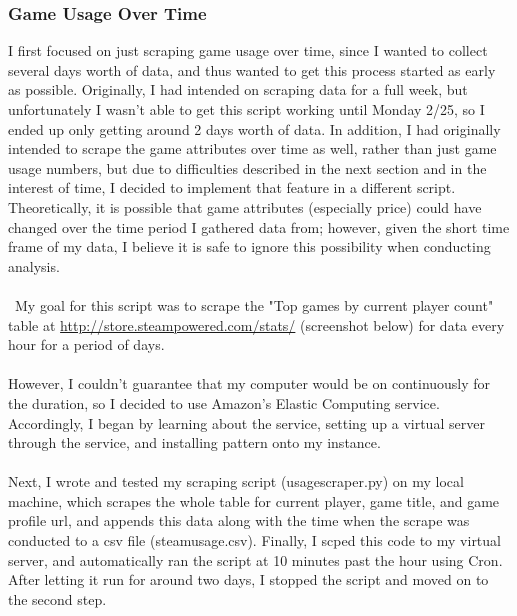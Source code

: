 \documentclass[pdftex,12pt,a4paper]{article}
\begin{document}
\subsubsection{Game Usage Over Time}
I first focused on just scraping game usage over time, since I wanted to collect several days worth of data, and thus wanted to get this process started as early as possible. Originally, I had intended on scraping data for a full week, but unfortunately I wasn't able to get this script working until Monday 2/25, so I ended up only getting around 2 days worth of data. In addition, I had originally intended to scrape the game attributes over time as well, rather than just game usage numbers, but due to difficulties described in the next section and in the interest of time, I decided to implement that feature in a different script. Theoretically, it is possible that game attributes (especially price) could have changed over the time period I gathered data from; however, given the short time frame of my data, I believe it is safe to ignore this possibility when conducting analysis. \\ \\\
My goal for this script was to scrape the "Top games by current player count" table at \url{http://store.steampowered.com/stats/} (screenshot below) for data every hour for a period of days. \\\\

However, I couldn't guarantee that my computer would be on continuously for the duration, so I decided to use Amazon's Elastic Computing service. Accordingly, I began by learning about the service, setting up a virtual server through the service, and installing pattern onto my instance. \\ \\

Next, I wrote and tested my scraping script (usagescraper.py) on my local machine, which scrapes the whole table for current player, game title, and game profile url, and appends this data along with the time when the scrape was conducted to a csv file (steamusage.csv). Finally, I scped this code to my virtual server, and automatically ran the script at 10 minutes past the hour using Cron. After letting it run for around two days, I stopped the script and moved on to the second step.
\end{document}
